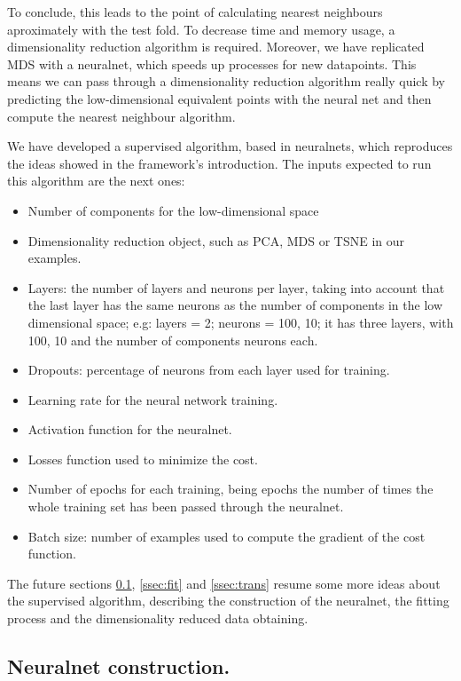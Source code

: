 \documentclass[a4paper,11pt,spanish]{report}
\begin{document}
To conclude, this leads to the point of calculating nearest neighbours aproximately with the test fold. To decrease time and memory usage, a dimensionality reduction algorithm is required. Moreover, we have replicated MDS with a neuralnet, which speeds up processes for new datapoints. This means we can pass through a dimensionality reduction algorithm really quick by predicting the low-dimensional equivalent points with the neural net and then compute the nearest neighbour algorithm.

\newpage
We have developed a supervised algorithm, based in neuralnets, which reproduces the ideas showed in the framework's introduction.
The inputs expected to run this algorithm are the next ones:

\begin{itemize}
\item Number of components for the low-dimensional space
\item Dimensionality reduction object, such as PCA, MDS or TSNE in our examples.
\item Layers: the number of layers and neurons per layer, taking into account that the last layer has the same neurons as the number of components in the low dimensional space; e.g: layers = 2; neurons = 100, 10; it has three layers, with 100, 10 and the number of components neurons each.
\item Dropouts: percentage of neurons from each layer used for training.
\item Learning rate for the neural network training.
\item Activation function for the neuralnet.
\item Losses function used to minimize the cost.
\item Number of epochs for each training, being epochs the number of times the whole training set has been passed through the neuralnet.
\item Batch size: number of examples used to compute the gradient of the cost function.
\end{itemize}

The future sections \ref{ssec:nnc}, \ref{ssec:fit} and \ref{ssec:trans} resume some more ideas about the supervised algorithm, describing the construction of the neuralnet, the fitting process and the dimensionality reduced data obtaining.

\subsection{Neuralnet construction.}
\label{ssec:nnc}
\end{document}
